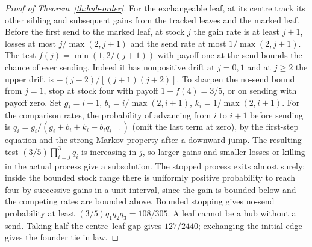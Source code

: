 \documentclass[11pt]{article}
\theoremstyle{remark}
\numberwithin{equation}{section}
\begin{document}
\begin{proof}[Proof of Theorem~\ref{th:hub-order}]
For the exchangeable leaf, at its centre track its other sibling and subsequent gains from the tracked leaves and the marked leaf. Before the first send to the marked leaf, at stock $j$ the gain rate is at least $j+1$, losses at most $j/\max(2,j+1)$ and the send rate at most $1/\max(2,j+1)$. The test $f(j)=\min(1,2/(j+1))$ with payoff one at the send bounds the chance of ever sending. Indeed it has nonpositive drift at $j=0,1$ and at $j\ge2$ the upper drift is $-(j-2)/[(j+1)(j+2)]$. To sharpen the no-send bound from $j=1$, stop at stock four with payoff $1-f(4)=3/5$, or on sending with payoff zero. Set $g_i=i+1$, $b_i=i/\max(2,i+1)$, $k_i=1/\max(2,i+1)$. For the comparison rates, the probability of advancing from $i$ to $i+1$ before sending is $q_i=g_i/(g_i+b_i+k_i-b_iq_{i-1})$ (omit the last term at zero), by the first-step equation and the strong Markov property after a downward jump. The resulting test $(3/5)\prod_{i=j}^3q_i$ is increasing in $j$, so larger gains and smaller losses or killing in the actual process give a subsolution. The stopped process exits almost surely: inside the bounded stock range there is uniformly positive probability to reach four by successive gains in a unit interval, since the gain is bounded below and the competing rates are bounded above. Bounded stopping gives no-send probability at least $(3/5)q_1q_2q_3=108/305$. A leaf cannot be a hub without a send. Taking half the centre--leaf gap gives $127/2440$; exchanging the initial edge gives the founder tie in law.
\end{proof}
\end{document}
